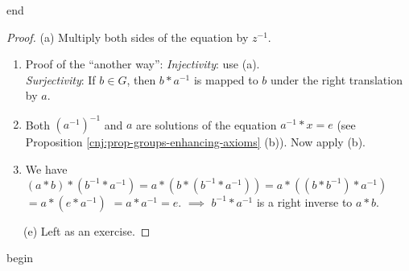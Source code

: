 \documentclass[
  12pt,
  a4paper,
  twoside]{article}
\theoremstyle{plain}
\theoremstyle{definition}
\begin{document}
\csname end

\begin{proof}
\iffalse{} {Proof. } \fi{}(a) Multiply both sides of the equation by \(z^{-1}\).

\begin{enumerate}
\def\labelenumi{(\alph{enumi})}
\setcounter{enumi}{1}
\item
  Proof of the ``another way'': \emph{Injectivity}: use (a).\\
  \emph{Surjectivity}: If \(b\in G\), then \(b*a^{-1}\) is mapped to \(b\) under the right translation by \(a\).
\item
  Both \((a^{-1})^{-1}\) and \(a\) are solutions of the equation \(a^{-1}*x=e\) (see Proposition \ref{cnj:prop-groups-enhancing-axioms} (b)). Now apply (b).
\item
  We have \((a*b)*(b^{-1}*a^{-1}) = a*(b*(b^{-1}*a^{-1})) = a*((b*b^{-1})*a^{-1})\) \(= a*(e*a^{-1})\) \(=a*a^{-1} = e\). \(\implies\) \(b^{-1}*a^{-1}\) is a right inverse to \(a*b\).
\end{enumerate}

\(\)~~~(e) Left as an exercise.
\end{proof}

\csname begin\label{cnj:expl-groups-more}
\end{document}
